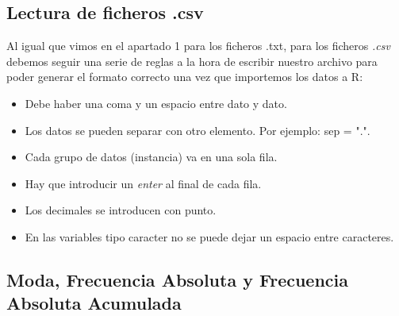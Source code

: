 \documentclass [a4paper] {article}
\begin{document}
\subsection{Lectura de ficheros .csv}
Al igual que vimos en el apartado 1 para los ficheros .txt, para los ficheros \textit{.csv} debemos
seguir una serie de reglas a la hora de escribir nuestro archivo para poder generar el formato correcto
una vez que importemos los datos a R:
\begin{itemize}
	\item Debe haber una coma y un espacio entre dato y dato.
	\item Los datos se pueden separar con otro elemento. Por ejemplo: sep = ".".
	\item Cada grupo de datos (instancia) va en una sola fila.
    \item Hay que introducir un \textit{enter} al final de cada fila.
	\item Los decimales se introducen con punto.
	\item En las variables tipo caracter no se puede dejar un espacio entre caracteres.
\end{itemize}



\subsection{Moda, Frecuencia Absoluta y Frecuencia Absoluta Acumulada}
\end{document}
